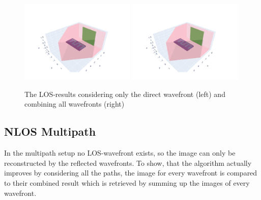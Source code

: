 \begin{figure}
    \centering
    \includegraphics[width=0.49\textwidth]{figures/result_multipath_los_direct.pdf}
    \includegraphics[width=0.49\textwidth]{figures/result_multipath_los_combined.pdf}
    \caption{The LOS-results considering only the direct wavefront (left) and combining all wavefronts (right)}\label{fig:MultipathLOS}
\end{figure}


\subsection{NLOS Multipath}
In the multipath setup no LOS-wavefront exists, so the image can only be reconstructed by the reflected wavefronts.
To show, that the algorithm actually improves by considering all the paths, the image for every wavefront is compared to their combined result which is retrieved by summing up the images of every wavefront.

